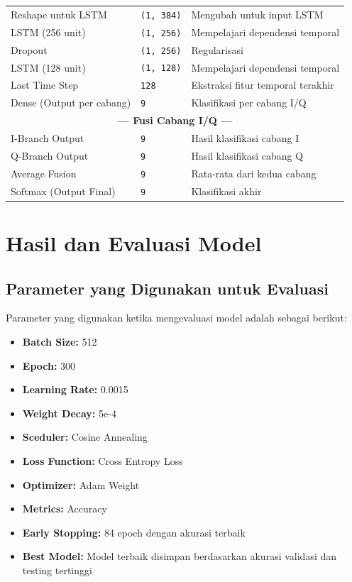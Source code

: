 \documentclass{article}
\begin{document}
\begin{table}[h]
\begin{tabular}{|l|l|l|}
Reshape untuk LSTM & \texttt{(1, 384)} & Mengubah untuk input LSTM \\
LSTM (256 unit) & \texttt{(1, 256)} & Mempelajari dependensi temporal \\
Dropout & \texttt{(1, 256)} & Regularisasi \\
LSTM (128 unit) & \texttt{(1, 128)} & Mempelajari dependensi temporal \\
Last Time Step & \texttt{128} & Ekstraksi fitur temporal terakhir \\
Dense (Output per cabang) & \texttt{9} & Klasifikasi per cabang I/Q \\
\hline
\multicolumn{3}{|c|}{\textbf{--- Fusi Cabang I/Q ---}} \\
\hline
I-Branch Output & \texttt{9} & Hasil klasifikasi cabang I \\
Q-Branch Output & \texttt{9} & Hasil klasifikasi cabang Q \\
Average Fusion & \texttt{9} & Rata-rata dari kedua cabang \\
Softmax (Output Final) & \texttt{9} & Klasifikasi akhir \\
\hline
\end{tabular}
\end{table}

\newpage
\section{Hasil dan Evaluasi Model}
\subsection{Parameter yang Digunakan untuk Evaluasi}
Parameter yang digunakan ketika mengevaluasi model adalah sebagai berikut: 
\begin{itemize}
    \item \textbf{Batch Size:} 512
    \item \textbf{Epoch:} 300 
    \item \textbf{Learning Rate:} 0.0015 
    \item \textbf{Weight Decay:} 5e-4 
    \item \textbf{Sceduler:} Cosine Annealing
    \item \textbf{Loss Function:} Cross Entropy Loss
    \item \textbf{Optimizer:} Adam Weight 
    \item \textbf{Metrics:} Accuracy 
    \item \textbf{Early Stopping:} 84 epoch dengan akurasi terbaik 
    \item \textbf{Best Model:} Model terbaik disimpan berdasarkan akurasi validasi dan testing tertinggi 
\end{itemize} 
\end{document}
